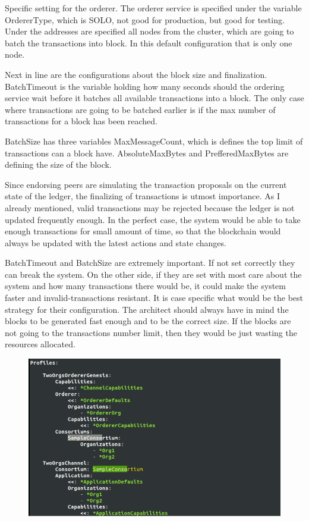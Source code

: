 \documentclass[a4paper,11pt]{report}
\begin{document}
Specific setting for the orderer. The orderer service is specified under the variable OrdererType, which is SOLO, not good for production, but good for testing. Under the addresses are specified all nodes from the cluster, which are going to batch the transactions into block. In this default configuration that is only one node.
 
Next in line are the configurations about the block size and finalization. BatchTimeout is the variable holding how many seconds should the ordering service wait before it batches all available transactions into a block. The only case where transactions are going to be batched earlier is if the max number of transactions for a block has been reached.

	BatchSize has three variables MaxMessageCount, which is defines the top limit of transactions can a block have. AbsoluteMaxBytes and PrefferedMaxBytes are defining the size of the block.
	
	Since endorsing peers are simulating the transaction proposals on the current state of the ledger, the finalizing of transactions is utmost importance. As I already mentioned, valid transactions may be rejected because the ledger is not updated frequently enough. In the perfect case, the system would be able to take enough transactions for small amount of time, so that the blockchain would always be updated with the latest actions and state changes. 
	
	BatchTimeout and BatchSize are extremely important. If not set correctly they can break the system. On the other side, if they are set with most care about the system and how many transactions there would be, it could make the system faster and invalid-transactions resistant. It is case specific what would be the best strategy for their configuration. The architect should always have in mind the blocks to be generated fast enough and to be the correct size. If the blocks are not going to the transactions number limit, then they would be just wasting the resources allocated.  


\begin{figure}[h]
\centering
  \includegraphics[width = 16cm]{configtx3.png}
  \caption{}
  \label{configtx3}
\end{figure}
\end{document}
